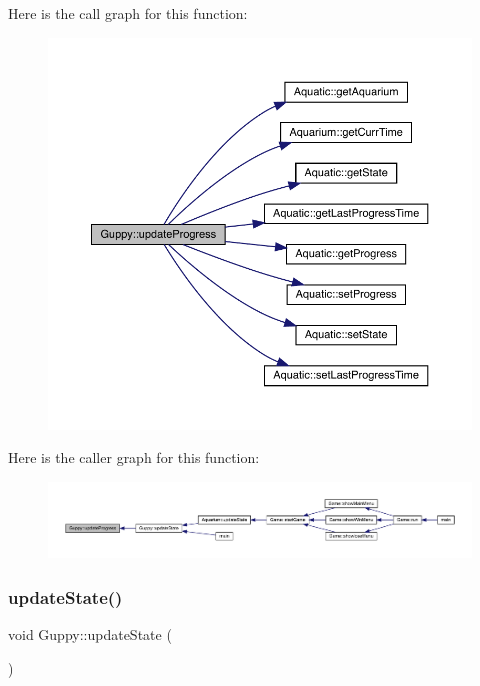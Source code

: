 Here is the call graph for this function\+:\nopagebreak
\begin{figure}[H]
\begin{center}
\leavevmode
\includegraphics[width=350pt]{class_guppy_af22eacc4a1ea7bec4be7b5d82148407b_cgraph}
\end{center}
\end{figure}
Here is the caller graph for this function\+:
\nopagebreak
\begin{figure}[H]
\begin{center}
\leavevmode
\includegraphics[width=350pt]{class_guppy_af22eacc4a1ea7bec4be7b5d82148407b_icgraph}
\end{center}
\end{figure}
\mbox{\label{class_guppy_ac62ef7053d40430ad98c1d5a54699f9d}} 
\subsubsection{\texorpdfstring{update\+State()}{updateState()}}
{\footnotesize\ttfamily void Guppy\+::update\+State (\begin{DoxyParamCaption}{ }\end{DoxyParamCaption})\hspace{0.3cm}{\ttfamily [virtual]}}



